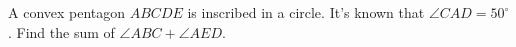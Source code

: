 A convex pentagon $ABCDE$ is inscribed in a circle. It's known that $\angle CAD=50^{\circ}$. Find the sum of $\angle ABC+\angle AED$.
